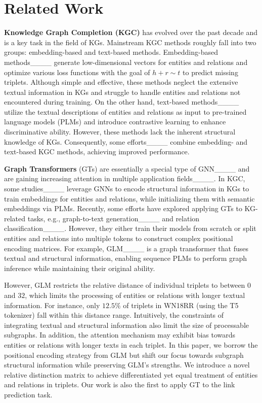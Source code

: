 \section{Related Work}
\label{Related_work:}

\textbf{Knowledge Graph Completion (KGC)} has evolved over the past decade and is a key task in the field of KGs. 
Mainstream KGC methods roughly fall into two groups: embedding-based and text-based methods.
Embedding-based methods____ generate low-dimensional vectors for entities and relations and optimize various loss functions with the goal of $h+r \sim t$ to predict missing triplets. 
Although simple and effective, these methods neglect the extensive textual information in KGs and struggle to handle entities and relations not encountered during training.
On the other hand, text-based methods____ utilize the textual descriptions of entities and relations as input to pre-trained language models (PLMs) and introduce contrastive learning to enhance discriminative ability. 
However, these methods lack the inherent structural knowledge of KGs.
Consequently, some efforts____ combine embedding- and text-based KGC methods, achieving improved performance.

\textbf{Graph Transformers} (GTs) are essentially a special type of GNN____ and are gaining increasing attention in multiple application fields____. In KGC, some studies____ leverage GNNs to encode structural information in KGs to train embeddings for entities and relations, while initializing them with semantic embeddings via PLMs. Recently, some efforts have explored applying GTs to KG-related tasks, e.g., graph-to-text generation____ and relation classification____. However, they either train their models from scratch or split entities and relations into multiple tokens to construct complex positional encoding matrices.
For example, GLM____ is a graph transformer that fuses textual and structural information, enabling sequence PLMs to perform graph inference while maintaining their original ability.

However, GLM restricts the relative distance of individual triplets to between $0$ and $32$, which limits the processing of entities or relations with longer textual information. 
For instance, only $12.5\%$ of triplets in WN18RR (using the T5 tokenizer) fall within this distance range. 
Intuitively, the constraints of integrating textual and structural information also limit the size of processable subgraphs.
In addition, the attention mechanism may exhibit bias towards entities or relations with longer texts in each triplet. 
In this paper, we borrow the positional encoding strategy from GLM but shift our focus towards subgraph structural information while preserving GLM's strengths. We introduce a novel relative distinction matrix to achieve differentiated yet equal treatment of entities and relations in triplets. 
Our work is also the first to apply GT to the link prediction task.



